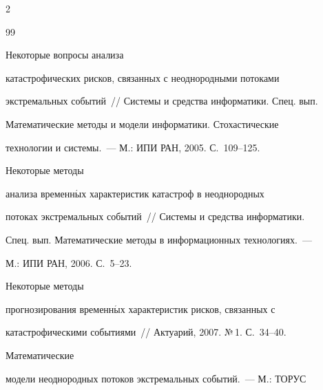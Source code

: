 \begin{multicols}{2}
{{%




\begin{thebibliography}{99}







 Некоторые вопросы анализа


катастрофических рисков, связанных с неоднородными потоками


экстремальных событий~// Систе\-мы и средства информатики. Спец. вып.


Математические методы и модели информатики. Стохастические


технологии и сис\-те\-мы.~--- М.: ИПИ РАН, 2005. С.~109--125.







 Некоторые методы


анализа временн$\acute{\mbox{ы}}$х характеристик катастроф в неоднородных


потоках экстремальных событий~// Сис\-те\-мы и средства информатики.


Спец. вып. Математические методы в информационных технологиях.~---


М.: ИПИ РАН, 2006. С.~5--23.







 Некоторые методы


прогнозирования временн$\acute{\mbox{ы}}$х характеристик рисков, связанных с


катастрофическими событиями~// Актуарий, 2007. №\,1. С.~34--40.







 Математические


модели неоднородных потоков экстремальных событий.~--- М.: ТОРУС



\end{thebibliography}}}
\end{multicols}
